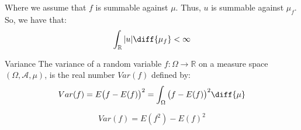     Where we assume that $f$ is summable against $\mu$. Thus,
    $u$ is summable against $\mu_{f}$. So, we have that:
    \begin{equation}
        \int_{\mathbb{R}}|u|\diff{\mu_{f}}<\infty
    \end{equation}
    \begin{ldefinition}{Variance}
        The variance of a random variable
        $f:\Omega\rightarrow\mathbb{R}$ on a measure space
        $(\Omega,\mathcal{A},\mu)$, is the real number
        $Var(f)$ defined by:
        \begin{equation}
            Var(f)=E\big(f-E(f)\big)^{2}
            =\int_{\Omega}\big(f-E(f)\big)^{2}\diff{\mu}
        \end{equation}
    \end{ldefinition}
    \begin{theorem}
        \begin{equation}
            Var(f)=E(f^{2})-E(f)^{2}
        \end{equation}
    \end{theorem}
